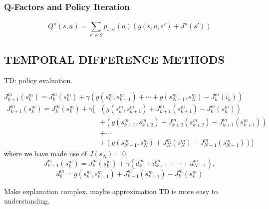 \subsubsection{Q-Factors and Policy Iteration}%

\[
    Q^{\pi}(s,a) = \sum^{}_{s' \in S} p_{s, s'}(a) (g(s, a, s') + J^{\pi}(s'))
\]

\subsection{TEMPORAL DIFFERENCE METHODS}%

{TD}: policy evaluation.

$ J^{m}_{k+1}(s^m_k) = J^{m}_{k}(s^m_k) + \gamma(g(s^m_k, s^m_{k+1}) + \cdots + g(s^{m}_{N-1}, s^{m}_{N}) - J^m_{k}(i_k)) $
\begin{align*}
    J^{m}_{k+1}(s^m_k) = J^{m}_{k}(s^m_k) + \gamma [ &
    (g(s^m_k, s^m_{k+1}) + J^m_{k+1}(s^m_{k+1}) - J^{m}_{k}(s^m_{k})) \\
    &+ (g(s^m_{k+1}, s^m_{k+2}) + J^m_{k+2}(s^m_{k+2}) - J^{m}_{k+1}(s^m_{k+1})) \\
    &+ \cdots \\
    &+ (g(s^m_{N-1}, s^m_{N}) + J^m_{N}(s^m_{N}) - J^{m}_{N-1}(s^m_{N-1}))
    ]
\end{align*}
where we have made use of $ J(s_N) = 0 $.
\[
    J^{m}_{k+1}(s^m_k) = J^{m}_{k}(s^m_k) + \gamma(d^{m}_{k} + d^{m}_{k+1} + \cdots + d^{m}_{N-1}),
\]
\[
    d^m_{k} = g(s^m_k, s^{m}_{k+1}) + J^{m}_{k+1}(s^m_{k+1}) - J^{m}_{k}(s^m_k)
\]

Make explanation complex, maybe approximation TD is more easy to understanding.



